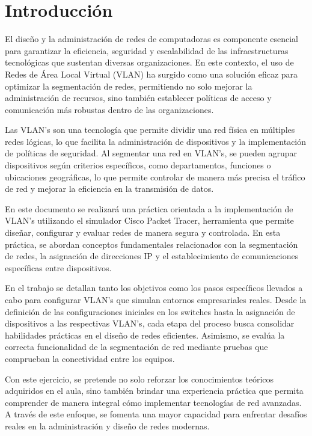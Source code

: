 \setcounter{page}{1}


\section{Introducción}
    El diseño y la administración de redes de computadoras es componente esencial para garantizar la eficiencia, seguridad y escalabilidad de las infraestructuras tecnológicas que sustentan diversas organizaciones. En este contexto, el uso de Redes de Área Local Virtual (VLAN) ha surgido como una solución eficaz para optimizar la segmentación de redes, permitiendo no solo mejorar la administración de recursos, sino también establecer políticas de acceso y comunicación más robustas dentro de las organizaciones.

    Las VLAN's son una tecnología que permite dividir una red física en múltiples redes lógicas, lo que facilita la administración de dispositivos y la implementación de políticas de seguridad. Al segmentar una red en VLAN's, se pueden agrupar dispositivos según criterios específicos, como departamentos, funciones o ubicaciones geográficas, lo que permite controlar de manera más precisa el tráfico de red y mejorar la eficiencia en la transmisión de datos.

    En este documento se realizará una práctica orientada a la implementación de VLAN's utilizando el simulador Cisco Packet Tracer, herramienta que permite diseñar, configurar y evaluar redes de manera segura y controlada. En esta práctica, se abordan conceptos fundamentales relacionados con la segmentación de redes, la asignación de direcciones IP y el establecimiento de comunicaciones específicas entre dispositivos.

    En el trabajo se detallan tanto los objetivos como los pasos específicos llevados a cabo para configurar VLAN's que simulan entornos empresariales reales. Desde la definición de las configuraciones iniciales en los switches hasta la asignación de dispositivos a las respectivas VLAN's, cada etapa del proceso busca consolidar habilidades prácticas en el diseño de redes eficientes. Asimismo, se evalúa la correcta funcionalidad de la segmentación de red mediante pruebas que comprueban la conectividad entre los equipos.

    Con este ejercicio, se pretende no solo reforzar los conocimientos teóricos adquiridos en el aula, sino también brindar una experiencia práctica que permita comprender de manera integral cómo implementar tecnologías de red avanzadas. A través de este enfoque, se fomenta una mayor capacidad para enfrentar desafíos reales en la administración y diseño de redes modernas.


